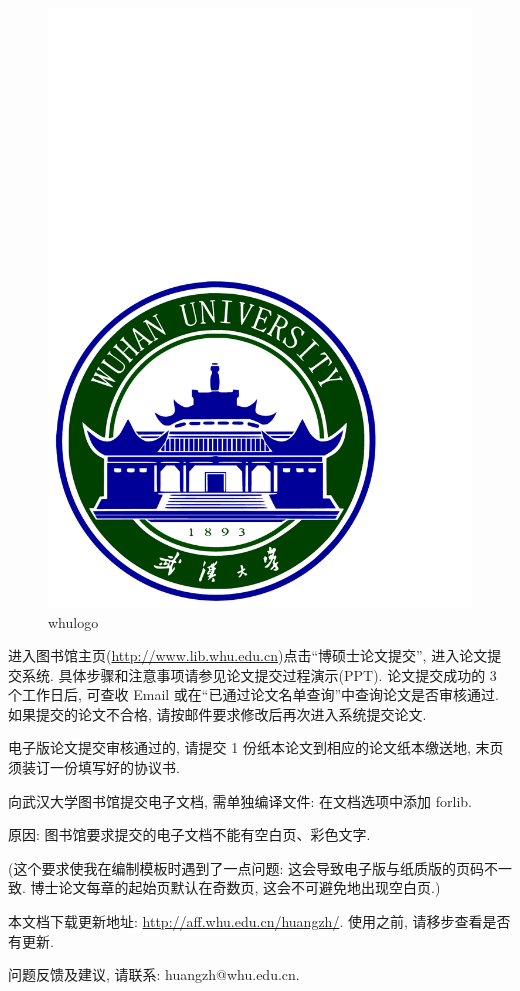 \begin{figure}[!ht]
\centering
\includegraphics[width=0.5\columnwidth]{data/global_figures/whulogo.pdf}
\caption{
whulogo
}
\label{whulogo}
\end{figure}






进入图书馆主页(\url{http://www.lib.whu.edu.cn})点击``博硕士论文提交'', 进入论文提交系统.
具体步骤和注意事项请参见论文提交过程演示(PPT).
论文提交成功的 3 个工作日后, 可查收 Email 或在``已通过论文名单查询''中查询论文是否审核通过.
如果提交的论文不合格, 请按邮件要求修改后再次进入系统提交论文.



电子版论文提交审核通过的, 请提交 1 份纸本论文到相应的论文纸本缴送地,
末页须装订一份填写好的协议书.



















向武汉大学图书馆提交电子文档, 需单独编译文件: 在文档选项中添加 forlib.

原因: 图书馆要求提交的电子文档不能有空白页、彩色文字.

({\kaishu 这个要求使我在编制模板时遇到了一点问题: 这会导致电子版与纸质版的页码不一致. 博士论文每章的起始页默认在奇数页, 这会不可避免地出现空白页.})


\vfill

本文档下载更新地址: \url{http://aff.whu.edu.cn/huangzh/}. 使用之前, 请移步查看是否有更新.

问题反馈及建议, 请联系: huangzh@whu.edu.cn.



























